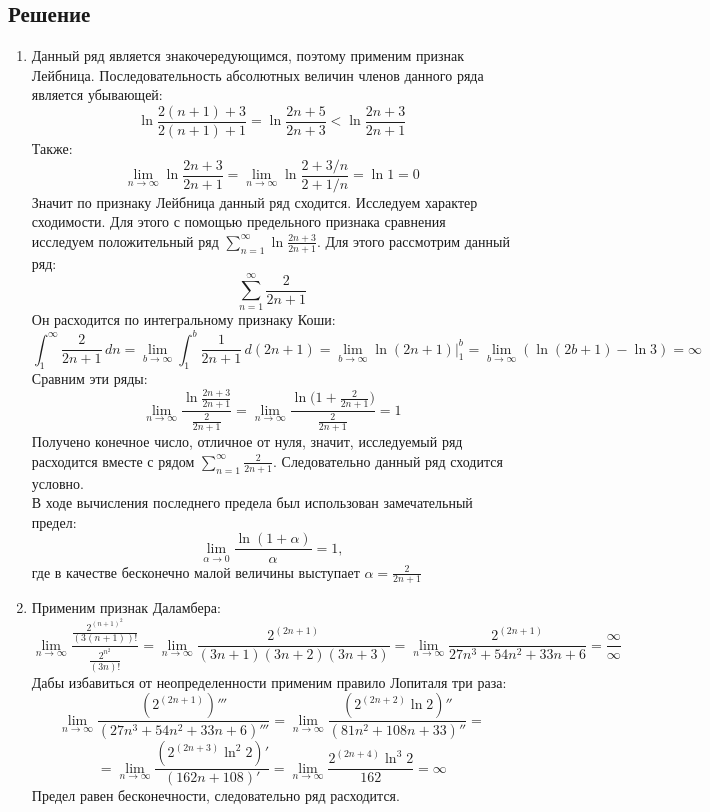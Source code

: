 \documentclass[12pt]{article}
\begin{document}
	\subsection*{Решение}
	\begin{enumerate}[wide, labelwidth=!, labelindent=0pt]
		\item Данный ряд является знакочередующимся, поэтому применим признак Лейбница. Последовательность абсолютных величин членов данного ряда является убывающей:
		$$ \ln{\frac{2(n+1) + 3}{2(n+1) + 1}} = \ln{\frac{2n + 5}{2n + 3}} < \ln{\frac{2n + 3}{2n + 1}} $$		
		Также:
		$$ \lim_{n \to \infty} \ln{\frac{2n + 3}{2n + 1}} = \lim_{n \to \infty} \ln{\frac{2 + 3/n}{2 + 1/n}}  = \ln{1} = 0 $$
		Значит по признаку Лейбница данный ряд сходится. Исследуем характер сходимости. Для этого с помощью предельного признака сравнения исследуем положительный ряд $ \sum_{n=1}^{\infty} \ln{\frac{2n + 3}{2n + 1}} $. Для этого рассмотрим данный ряд:
		$$ \sum_{n=1}^\infty \frac{2}{2n+1} $$
		Он расходится по интегральному признаку Коши:
		$$ \int_1^\infty \frac{2}{2n+1} \, dn = \lim_{b \to \infty} \int_1^b \frac{1}{2n+1} \, d(2n+1) = \lim_{b \to \infty} \ln{(2n+1)} \Big|_1^b = \lim_{b \to \infty} (\ln{(2b+1)} - \ln{3}) = \infty  $$
		Сравним эти ряды:
		$$ \lim_{n \to \infty} \frac{\ln{\frac{2n + 3}{2n + 1}}}{\frac{2}{2n+1}} = \lim_{n \to \infty} \frac{\ln{( 1 + \frac{2}{2n + 1}})}{\frac{2}{2n+1}} = 1 $$
		Получено конечное число, отличное от нуля, значит, исследуемый ряд расходится вместе с рядом $ \sum_{n=1}^\infty \frac{2}{2n+1} $. Следовательно данный ряд сходится условно. \\
		В ходе вычисления последнего предела был использован замечательный предел:
		$$ \lim_{\alpha \to 0} \frac{\ln{(1 + \alpha)}}{\alpha} = 1 ,$$
		где в качестве бесконечно малой величины выступает $ \alpha = \frac{2}{2n+1} $ 
		
		\newpage
		\item Применим признак Даламбера:		
		$$ \lim_{n \to \infty} \frac{\frac{2^{(n+1)^2}}{(3(n+1))!}}{\frac{2^{n^2}}{(3n)!}} = \lim_{n \to \infty} \frac{2^{(2n+1)}}{(3n+1)(3n+2)(3n+3)} = \lim_{n \to \infty} \frac{2^{(2n+1)}}{27 n^3 + 54 n^2+  33 n  + 6} = \frac{\infty}{\infty} $$
		Дабы избавиться от неопределенности применим правило Лопиталя три раза: 
		$$ \lim_{n \to \infty} \frac{(2^{(2n+1)})'''}{(27 n^3 + 54 n^2+  33 n  + 6)'''} = \lim_{n \to \infty} \frac{(2^{(2n+2)} \ln{2})''}{(81 n^2 + 108 n + 33 )''} = $$
		$$ = \lim_{n \to \infty} \frac{(2^{(2n+3)} \ln^2{2})'}{(162 n + 108)'} = \lim_{n \to \infty} \frac{2^{(2n+4)} \ln^3{2}}{162 } = \infty $$
		Предел равен бесконечности, следовательно ряд расходится.


\end{enumerate}
\end{document}
